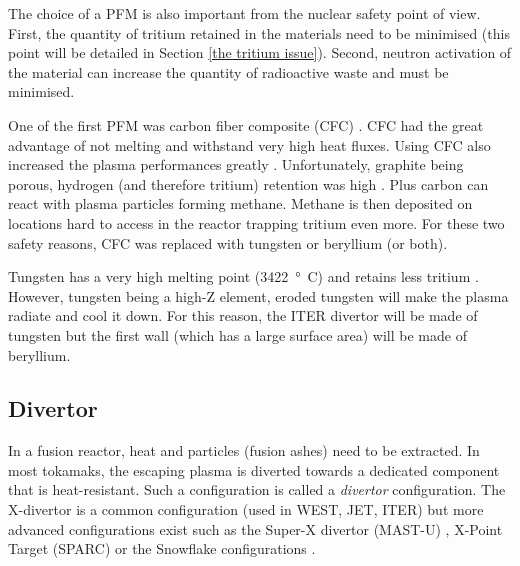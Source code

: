 The choice of a PFM is also important from the nuclear safety point of view.
First, the quantity of tritium retained in the materials need to be minimised (this point will be detailed in Section \ref{the tritium issue}).
Second, neutron activation of the material can increase the quantity of radioactive waste and must be minimised.

One of the first PFM was carbon fiber composite (CFC) .
CFC had the great advantage of not melting and withstand very high heat fluxes.
Using CFC also increased the plasma performances greatly .
Unfortunately, graphite being porous, hydrogen (and therefore tritium) retention was high .
Plus carbon can react with plasma particles forming methane.
Methane is then deposited on locations hard to access in the reactor trapping tritium even more.
For these two safety reasons, CFC was replaced with tungsten or beryllium (or both).

Tungsten has a very high melting point (\SI{3422}{°C}) and retains less tritium .
However, tungsten being a high-Z element, eroded tungsten will make the plasma radiate and cool it down.
For this reason, the ITER divertor will be made of tungsten but the first wall (which has a large surface area) will be made of beryllium.

\subsection{Divertor}\label{divertor section}

In a fusion reactor, heat and particles (fusion ashes) need to be extracted.
In most tokamaks, the escaping plasma is diverted towards a dedicated component that is heat-resistant.
Such a configuration is called a \textit{divertor} configuration.
The X-divertor is a common configuration (used in WEST, JET, ITER) but more advanced configurations exist such as the Super-X divertor (MAST-U) , X-Point Target (SPARC)  or the Snowflake configurations .

